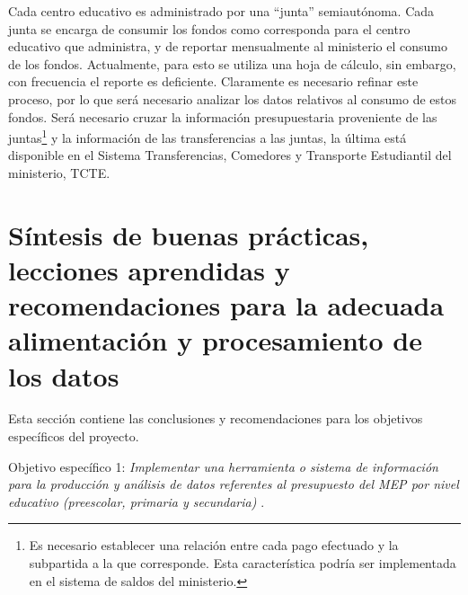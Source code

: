 \documentclass[a4paper, 9pt, conference]{article}
\begin{document}
Cada centro educativo es administrado por una ``junta'' semiaut\'onoma. Cada junta se encarga de consumir los fondos como corresponda para el centro educativo que administra, y de reportar mensualmente al ministerio el consumo de los fondos. Actualmente, para esto se utiliza una hoja de c\'alculo, sin embargo, con frecuencia el reporte es deficiente. Claramente es necesario refinar este proceso, por lo que ser\'a necesario analizar los datos relativos al consumo de estos fondos. Ser\'a necesario cruzar la informaci\'on presupuestaria proveniente de las juntas\footnote{Es necesario establecer una relaci\'on entre cada pago efectuado y la subpartida a la que corresponde. Esta caracter\'istica podr\'ia ser implementada en el sistema de saldos del ministerio.} y la informaci\'on de las transferencias a las juntas, la \'ultima est\'a disponible en el Sistema Transferencias, Comedores y Transporte Estudiantil del ministerio, TCTE.

\section{S\'intesis de buenas pr\'acticas, lecciones aprendidas y recomendaciones para la adecuada alimentaci\'on y procesamiento de los datos}

Esta secci\'on contiene las conclusiones y recomendaciones para los objetivos espec\'ificos del proyecto.

Objetivo espec\'ifico 1: \emph{Implementar una herramienta o sistema de informaci\'on para la producci\'on y an\'alisis de datos referentes al presupuesto del MEP por nivel educativo (preescolar, primaria y secundaria)} \cite{trd}.
\end{document}
